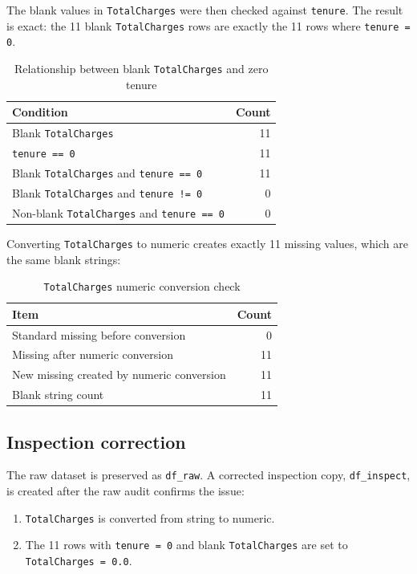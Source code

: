 The blank values in \texttt{TotalCharges} were then checked against \texttt{tenure}. The result is exact: the 11 blank \texttt{TotalCharges} rows are exactly the 11 rows where \texttt{tenure = 0}.

\begin{table}[H]
\centering
\caption{Relationship between blank \texttt{TotalCharges} and zero tenure}
\begin{tabular}{lr}
\toprule
Condition & Count \\
\midrule
Blank \texttt{TotalCharges} & 11 \\
\texttt{tenure == 0} & 11 \\
Blank \texttt{TotalCharges} and \texttt{tenure == 0} & 11 \\
Blank \texttt{TotalCharges} and \texttt{tenure != 0} & 0 \\
Non-blank \texttt{TotalCharges} and \texttt{tenure == 0} & 0 \\
\bottomrule
\end{tabular}
\end{table}

Converting \texttt{TotalCharges} to numeric creates exactly 11 missing values, which are the same blank strings:

\begin{table}[H]
\centering
\caption{\texttt{TotalCharges} numeric conversion check}
\begin{tabular}{lr}
\toprule
Item & Count \\
\midrule
Standard missing before conversion & 0 \\
Missing after numeric conversion & 11 \\
New missing created by numeric conversion & 11 \\
Blank string count & 11 \\
\bottomrule
\end{tabular}
\end{table}

\subsection{Inspection correction}

The raw dataset is preserved as \texttt{df\_raw}. A corrected inspection copy, \texttt{df\_inspect}, is created after the raw audit confirms the issue:

\begin{enumerate}[leftmargin=*]
    \item \texttt{TotalCharges} is converted from string to numeric.
    \item The 11 rows with \texttt{tenure = 0} and blank \texttt{TotalCharges} are set to \texttt{TotalCharges = 0.0}.
\end{enumerate}

